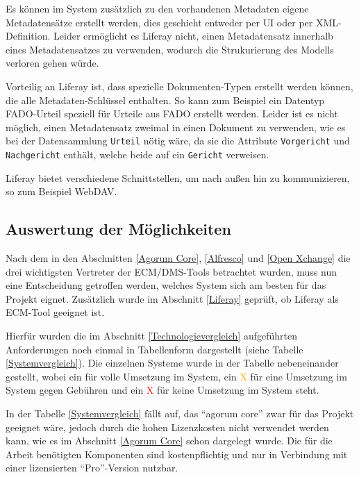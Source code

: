 Es k\"onnen im System zus\"atzlich zu den vorhandenen Metadaten eigene Metadatens\"atze erstellt werden, dies geschieht entweder per \ac{UI} oder per XML-Definition.
Leider erm\"oglicht es  Liferay nicht, einen Metadatensatz innerhalb eines Metadatensatzes zu verwenden, wodurch die Strukurierung des Modells verloren gehen w\"urde.

Vorteilig an Liferay ist, dass spezielle Dokumenten-Typen erstellt werden k\"onnen, die alle Metadaten-Schl\"ussel enthalten. So kann zum Beispiel ein Datentyp \ac{FADO}-Urteil speziell f\"ur Urteile aus \ac{FADO} erstellt werden. Leider ist es nicht m\"oglich, einen Metadatensatz zweimal in einen Dokument zu verwenden, wie es bei der Datensammlung \texttt{Urteil} n\"otig w\"are, da sie die Attribute \texttt{Vorgericht} und \texttt{Nachgericht} enth\"alt, welche beide auf ein \texttt{Gericht} verweisen.

Liferay bietet verschiedene Schnittstellen, um nach au\ss{}en hin zu kommunizieren, so zum Beispiel WebDAV.

\subsection{Auswertung der M\"oglichkeiten}\label{Auswertung ECM}
Nach dem in den Abschnitten \ref{Agorum Core}, \ref{Alfresco} und \ref{Open Xchange} die drei wichtigsten Vertreter der \ac{ECM}/\ac{DMS}-Tools
betrachtet wurden, muss nun eine Entscheidung getroffen werden, welches System sich am besten f\"ur das Projekt eignet. Zus\"atzlich wurde im Abschnitt \ref{Liferay} gepr\"uft, ob Liferay als ECM-Tool geeignet ist.

Hierf\"ur wurden die im Abschnitt \ref{Technologievergleich} aufgef\"uhrten Anforderungen noch einmal in Tabellenform dargestellt (siehe Tabelle \ref{Systemvergleich}). Die einzelnen Systeme wurde in der Tabelle nebeneinander gestellt, wobei ein \textcolor{green}{\checkmark} f\"ur volle Umsetzung im System, ein \textcolor{orange}{\checkmark X} f\"ur eine Umsetzung im System gegen Geb\"uhren und ein \textcolor{red}{X} f\"ur keine Umsetzung im System steht.

In der Tabelle \ref{Systemvergleich} f\"allt auf, das "`agorum core"' zwar f\"ur das Projekt geeignet w\"are, jedoch durch die hohen Lizenzkosten nicht verwendet werden kann, wie es im Abschnitt \ref{Agorum Core} schon dargelegt wurde. Die f\"ur die Arbeit ben\"otigten Komponenten sind kostenpflichtig und nur in Verbindung mit einer lizensierten "`Pro"'-Version nutzbar.

